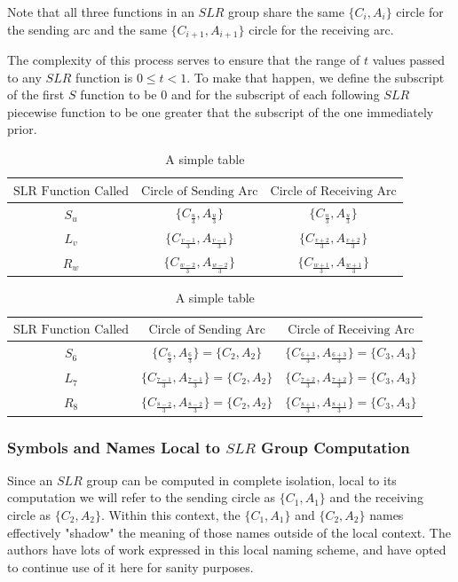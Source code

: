 \documentclass{article}
\begin{document}
Note that all three functions in an $SLR$ group share the same $\{C_i, A_i\}$ circle for the sending arc and the same $\{C_{i+1}, A_{i+1}\}$ circle for the receiving arc.

The complexity of this process serves to ensure that the range of $t$ values passed to any $SLR$ function is $0 \leq t < 1$. To make that happen, we define the subscript of the first $S$ function to be $0$ and for the subscript of each following $SLR$ piecewise function to be one greater that the subscript of the one immediately prior.

\begin{table}[h]
\centering
\begin{tabular}{|c|c|c|}
\hline
$\text{SLR Function Called}$ & $\text{Circle of Sending Arc}$ & $\text{Circle of Receiving Arc}$ \\
\hline
$S_u$ & $\{C_\frac{u}{3}, A_\frac{u}{3}\}$ & $\{C_\frac{u}{3}, A_\frac{u}{3}\}$\\
$L_v$ & $\{C_\frac{v-1}{3}, A_\frac{v-1}{3}\}$ & $\{C_\frac{v+2}{3}, A_\frac{v+2}{3}\}$\\
$R_w$ & $\{C_\frac{w-2}{3}, A_\frac{w-2}{3}\}$ & $\{C_\frac{w+1}{3}, A_\frac{w+1}{3}\}$\\
\hline
\end{tabular}
\caption{A simple table}
\label{tab:my_conversion_from_SLR_subscript_to_circle_subscripts}
\end{table}

\begin{table}[h]
\centering
\begin{tabular}{|c|c|c|}
\hline
$\text{SLR Function Called}$ & $\text{Circle of Sending Arc}$ & $\text{Circle of Receiving Arc}$ \\
\hline
$S_6$ & $\{C_\frac{6}{3}, A_\frac{6}{3}\} = \{C_2, A_2\}$ & $\{C_\frac{6+3}{3}, A_\frac{6+3}{3}\} = \{C_3, A_3\}$\\
$L_7$ & $\{C_\frac{7-1}{3}, A_\frac{7-1}{3}\} = \{C_2, A_2\}$ & $\{C_\frac{7+2}{3}, A_\frac{7+2}{3}\} = \{C_3, A_3\}$\\
$R_8$ & $\{C_\frac{8-2}{3}, A_\frac{8-2}{3}\} = \{C_2, A_2\}$ & $\{C_\frac{8+1}{3}, A_\frac{8+1}{3}\} = \{C_3, A_3\}$\\
\hline
\end{tabular}
\caption{A simple table}
\label{tab:my_conversion_from_SLR_subscript_to_circle_subscripts_EXAMPLE}
\end{table}

\subsubsection{Symbols and Names Local to $SLR$ Group Computation}
\label{subsub:local_point_indices}
Since an $SLR$ group can be computed in complete isolation, local to its computation we will refer to the sending circle as $\{C_1, A_1\}$ and the receiving circle as $\{C_2, A_2\}$. Within this context, the $\{C_1, A_1\}$ and $\{C_2, A_2\}$ names effectively "shadow" the meaning of those names outside of the local context. The authors have lots of work expressed in this local naming scheme, and have opted to continue use of it here for sanity purposes.
\end{document}
